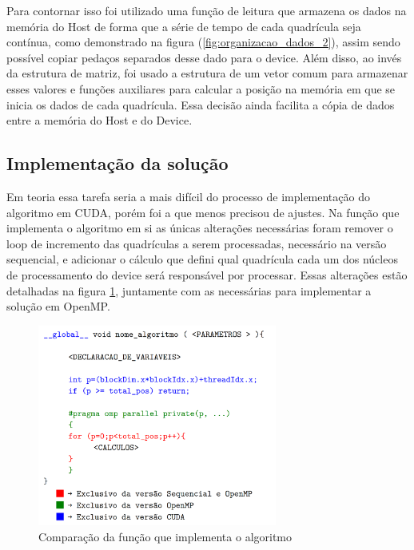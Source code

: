 Para contornar isso foi utilizado uma função de leitura que armazena os dados na memória do Host de forma que a série de tempo de cada quadrícula seja contínua, como demonstrado na figura (\ref{fig:organizacao_dados_2}), assim sendo possível copiar pedaços separados desse dado para o device. Além disso, ao invés da estrutura de matriz, foi usado a estrutura de um vetor comum para armazenar esses valores e funções auxiliares para calcular a posição na memória em que se inicia os dados de cada quadrícula. Essa decisão ainda facilita a cópia de dados entre a memória do Host e do Device.

\subsection{Implementação da solução}\label{cap:implementacao_solucao}

Em teoria essa tarefa seria a mais difícil do processo de implementação do algoritmo em CUDA, porém foi a que menos precisou de ajustes. Na função que implementa o algoritmo em si as únicas alterações necessárias foram remover o loop de incremento das quadrículas a serem processadas, necessário na versão sequencial, e adicionar o cálculo que defini qual quadrícula cada um dos núcleos de processamento do device será responsável por processar. Essas alterações estão detalhadas na figura \ref{fig:comparacao_codigo_padrao}, juntamente com as necessárias para implementar a solução em OpenMP.

\begin{figure}[H]
\centering
\includegraphics[width=0.7\textwidth]{Imagens/comparacao_codigo/comparacao_codigo_padrao.png}
\caption{Comparação da função que implementa o algoritmo}
\label{fig:comparacao_codigo_padrao}
\end{figure}

